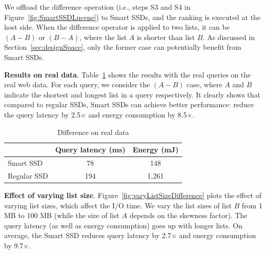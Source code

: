 We offload the \textsf{difference} operation (i.e., steps S3 and S4 in Figure~\ref{fig:SmartSSDLucene}) to Smart SSDs, and the ranking is executed at the host side. When the \textsf{difference} operator is applied to two lists, it can be $(A-B)$ or $(B-A)$, where the list $A$ is shorter than list $B$. As discussed in Section~\ref{sec:designSpace}, only the former case can potentially benefit from Smart SSDs.



\textbf{Results on real data}.
Table~\ref{tab:diffRealData} shows the results with the real queries on the real web data. For each query, we consider the $(A-B)$ case, where $A$ and $B$ indicate the shortest and longest list in a query respectively. It clearly shows that compared to regular SSDs, Smart SSDs can achieve better performance: reduce the query latency by 2.5$\times$ and energy consumption by 8.5$\times$.

\begin{table}[htbp]\small
\centering
\begin{tabular}{l|c|c}\hline\hline
& \textbf{Query latency (ms)} & \textbf{Energy (mJ)}\\\hline
Smart SSD & 78 & 148\\\hline
Regular SSD & 194 & 1,261 \\\hline\hline
\end{tabular}
\caption{Difference on real data}\label{tab:diffRealData}
\end{table}

\textbf{Effect of varying list size}.
Figure~\ref{fig:varyListSizeDifference} plots the effect of varying list sizes, which affect the I/O time.
We vary the list sizes of list $B$ from 1 MB to 100 MB (while the size of list $A$ depends on the skewness factor).
The query latency (as well as energy consumption) goes up with longer lists.
On average, the Smart SSD reduces query latency by 2.7$\times$ and energy consumption by 9.7$\times$.

